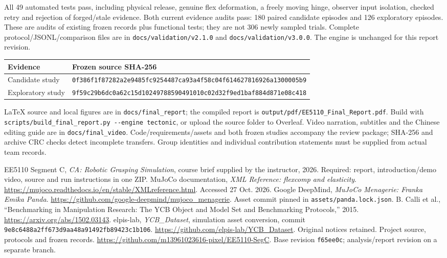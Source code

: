 \documentclass[10pt,a4paper]{article}
\newcommand{\code}[1]{\nolinkurl{#1}}
\newcommand{\subhead}[1]{\par\vspace{3pt}{\bfseries\color{teal}#1}\par}
\begin{document}
\subhead{Verified evidence and deliverable map}
All 49 automated tests pass, including physical release, genuine flex deformation, a freely moving hinge, observer input isolation, checked retry and rejection of forged/stale evidence. Both current evidence audits pass: 180 paired candidate episodes and 126 exploratory episodes. These are audits of existing frozen records plus functional tests; they are not 306 newly sampled trials. Complete protocol/JSONL/comparison files are in \code{docs/validation/v2.1.0} and \code{docs/validation/v3.0.0}. The engine is unchanged for this report revision.

{\scriptsize
\begin{tabularx}{\linewidth}{@{}p{25mm}Y@{}}
\toprule Evidence & Frozen source SHA-256 \\
\midrule Candidate study & \code{0f386f1f87282a2e9485fc9254487ca93a4f58c04f614627816926a1300005b9} \\
Exploratory study & \code{9f59c29b6dc0a62c15d10249788590491010c02d32f9ed1baf884d871e08c418} \\
\bottomrule
\end{tabularx}}

LaTeX source and local figures are in \code{docs/final_report}; the compiled report is \code{output/pdf/EE5110_Final_Report.pdf}. Build with \code{scripts/build_final_report.py --engine tectonic}, or upload the source folder to Overleaf. Video narration, subtitles and the Chinese editing guide are in \code{docs/final_video}. Code/requirements/assets and both frozen studies accompany the review package; SHA-256 and archive CRC checks detect incomplete transfers. Group identities and individual contribution statements must be supplied from actual team records.

\vspace{-3pt}
\begin{thebibliography}{6}\small\setlength{\itemsep}{1pt}\setlength{\parskip}{0pt}
 EE5110 Segment C, \emph{CA: Robotic Grasping Simulation}, course brief supplied by the instructor, 2026. Required: report, introduction/demo video, source and run instructions in one ZIP.
 MuJoCo documentation, \emph{XML Reference: flexcomp and elasticity}. \url{https://mujoco.readthedocs.io/en/stable/XMLreference.html}. Accessed 27 Oct. 2026.
 Google DeepMind, \emph{MuJoCo Menagerie: Franka Emika Panda}. \url{https://github.com/google-deepmind/mujoco_menagerie}. Asset commit pinned in \code{assets/panda.lock.json}.
 B. Calli et al., ``Benchmarking in Manipulation Research: The YCB Object and Model Set and Benchmarking Protocols,'' 2015. \url{https://arxiv.org/abs/1502.03143}.
 elpis-lab, \emph{YCB\_Dataset}, simulation asset conversion, commit \code{9e8c6488a2ff673d9aa48a91492fb89423c1b106}. \url{https://github.com/elpis-lab/YCB_Dataset}. Original notices retained.
 Project source, protocols and frozen records. \url{https://github.com/m13961023616-pixel/EE5110-SegC}. Base revision \code{f65ee0c}; analysis/report revision on a separate branch.
\end{thebibliography}
\end{document}

